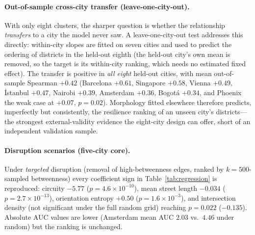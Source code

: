 \paragraph{Out-of-sample cross-city transfer (leave-one-city-out).} With only eight
clusters, the sharper question is whether the relationship \emph{transfers} to a city
the model never saw. A leave-one-city-out test addresses this directly: within-city
slopes are fitted on seven cities and used to predict the ordering of districts in the
held-out eighth (the held-out city's own mean is removed, so the target is its
within-city ranking, which needs no estimated fixed effect). The transfer is positive
in \emph{all eight} held-out cities, with mean out-of-sample Spearman $+0.42$
(Barcelona $+0.61$, Singapore $+0.58$, Vienna $+0.49$, İstanbul $+0.47$, Nairobi
$+0.39$, Amsterdam $+0.36$, Bogotá $+0.34$, and Phoenix the weak case at $+0.07$,
$p=0.02$). Morphology fitted elsewhere therefore predicts, imperfectly but consistently,
the resilience ranking of an unseen city's districts---the strongest external-validity
evidence the eight-city design can offer, short of an independent validation sample.

\paragraph{Disruption scenarios (five-city core).} Under \emph{targeted} disruption (removal of
high-betweenness edges, ranked by $k{=}500$-sampled betweenness) every coefficient
sign in Table~\ref{tab:regression} is reproduced: circuity $-5.77$
($p=4.6\times10^{-10}$), mean street length $-0.034$ ($p=2.7\times10^{-13}$),
orientation entropy $+0.50$ ($p=1.6\times10^{-3}$), and intersection density
(not significant under the full random grid) reaching $p=0.022$ ($-0.135$). Absolute
AUC values are lower (Amsterdam mean AUC $2.03$ vs.\ $4.46$ under random) but the
ranking is unchanged.

